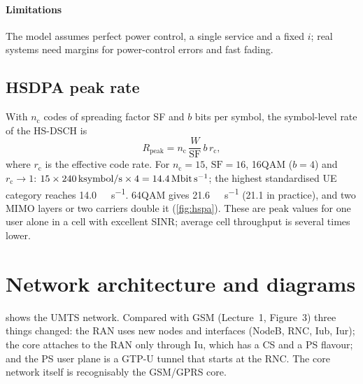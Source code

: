 \documentclass[11pt,a4paper]{article}
\begin{document}
\paragraph{Limitations} The model assumes perfect power control, a single service and a fixed
$i$; real systems need margins for power-control errors and fast fading.

\begin{acnfigure}
  \caption{Uplink noise rise $-10\log_{10}(1-\eta_{\mathrm{UL}})$ from \cref{eq:load}.}
  \label{fig:noise}
\end{acnfigure}

\subsection{HSDPA peak rate}\label{sec:hsdpa}
With $n_{\mathrm{c}}$ codes of spreading factor SF and $b$ bits per symbol, the symbol-level
rate of the HS-DSCH is
\begin{equation}\label{eq:hsdpa}
  R_{\mathrm{peak}} = n_{\mathrm{c}}\,\frac{W}{\mathrm{SF}}\,b\,r_{\mathrm{c}},
\end{equation}
where $r_\mathrm{c}$ is the effective code rate. For $n_\mathrm{c} = 15$, $\mathrm{SF}=16$, 16QAM
($b=4$) and $r_\mathrm{c}\to1$: $15\times240\,\text{ksymbol/s}\times4 = \qty{14.4}{\mega\bit\per\second}$;
the highest standardised UE category reaches \qty{14.0}{\mega\bit\per\second}. 64QAM gives
\qty{21.6}{\mega\bit\per\second} (21.1 in practice), and two MIMO layers or two carriers double
it (\cref{fig:hspa}). These are peak values for one user alone in a cell with excellent SINR;
average cell throughput is several times lower.

\begin{acnfigure}
  \caption{Peak downlink rates along the WCDMA/HSPA evolution (R99 shown with its practical
  384\,kbit/s; categories with the highest standardised rate).}
  \label{fig:hspa}
\end{acnfigure}

\section{Network architecture and diagrams}
 shows the UMTS network. Compared with GSM (Lecture~1, Figure~3) three things
changed: the RAN uses new nodes and interfaces (NodeB, RNC, Iub, Iur); the core attaches to the
RAN only through Iu, which has a CS and a PS flavour; and the PS user plane is a GTP-U tunnel
that starts at the RNC. The core network itself is recognisably the GSM/GPRS core.
\end{document}
